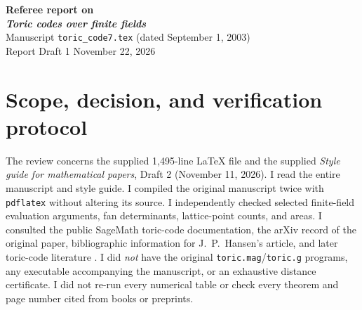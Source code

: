 \documentclass[12pt,letterpaper]{article}
\newcommand{\F}{\mathbb F}
\begin{document}
\begin{center}
{\LARGE\bfseries Referee report on\\[3pt]
\emph{Toric codes over finite fields}}\\[6pt]
{\large Manuscript \texttt{toric\_code7.tex} (dated September 1, 2003)}\\[4pt]
{\large Report Draft 1 \textemdash{} November 22, 2026}
\end{center}

\begin{abstract}
This AI-aided referee report was prepared with OpenAI ChatGPT (GPT-6); the scope and verification level of each mathematical check are identified below, and this AI review is not independent certification of the results.  The manuscript presents an interesting toric-code construction and a notable example with parameters $[49,11,28]$ over $\F_8$.  However, two stated minimum-distance conjectures admit elementary counterexamples, a general evaluation-injectivity lemma is false as quantified, and the decoding argument has incompatible evaluation and divisor hypotheses.  Several further propositions, geometric examples, and tables require correction.  I recommend \emph{major mathematical revision}, with the decoding section treated as an unproved proposal until reconstructed.  The central $[49,11]$ dimension calculation checks independently; a consulted SageMath reference records distance $28$, but I have not independently certified that exact distance.
\end{abstract}

\section{Scope, decision, and verification protocol}\label{sec:scope}
The review concerns the supplied 1,495-line \LaTeX{} file and the supplied \emph{Style guide for mathematical papers}, Draft 2 (November 11, 2026).  I read the entire manuscript and style guide.  I compiled the original manuscript twice with \texttt{pdflatex} without altering its source.  I independently checked selected finite-field evaluation arguments, fan determinants, lattice-point counts, and areas.  I consulted the public SageMath toric-code documentation, the arXiv record of the original paper, bibliographic information for J.~P.~Hansen's article, and later toric-code literature \cite{Jo04,Sa26,Ha00,Li11}.  I did \emph{not} have the original \texttt{toric.mag}/\texttt{toric.g} programs, any executable accompanying the manuscript, or an exhaustive distance certificate.  I did not re-run every numerical table or check every theorem and page number cited from books or preprints.
\end{document}
